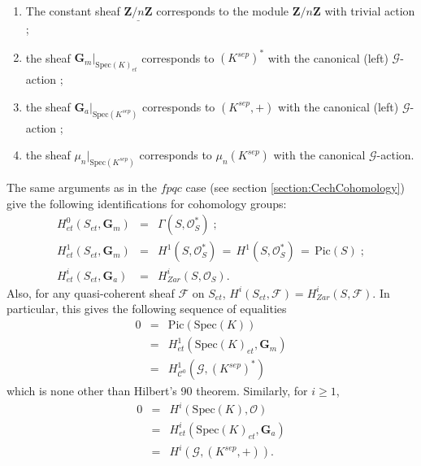 \begin{example} $ $
\begin{enumerate}
\item The constant sheaf $\underline{\mathbf{Z}/n\mathbf{Z}}$ corresponds to the module $\mathbf{Z}/n\mathbf{Z}$ with trivial action ; 
\item the sheaf $\mathbf{G}_m|_{\text{Spec}(K)_{et}}$ corresponds to $(K^{sep})^*$ with the canonical (left) $\mathcal{G}$-action ;
\item the sheaf $\mathbf{G}_a|_{\text{Spec}(K^{sep})}$ corresponds to $(K^{sep}, +)$ with the canonical (left) $\mathcal{G}$-action ;
\item the sheaf $\mu_n|_{\text{Spec}(K^{sep})}$ corresponds to $\mu_n(K^{sep})$ with the canonical $\mathcal{G}$-action.
\end{enumerate}

The same arguments as in the $fpqc$ case (see section \ref{section:CechCohomology}) give the following identifications for cohomology groups:
$$
\begin{array}{ccl}
H_{et}^0(S_{et}, \mathbf{G}_m) & = & \Gamma(S, \mathcal{O}_S^*) \; ; \\
H_{et}^1(S_{et}, \mathbf{G}_m) & = & H^1(S, \mathcal{O}_S^*) \, = \,  H^1(S, \mathcal{O}_S^*) \, = \, \text{Pic}(S) \; ;\\
H_{et}^i(S_{et}, \mathbf{G}_a) & = & H_{Zar}^i(S, \mathcal{O}_S).
\end{array}
$$
Also, for any quasi-coherent sheaf $\mathcal{F}$ on $S_{et}$, $H^i(S_{et}, \mathcal{F}) = H_{Zar}^i(S, \mathcal{F})$.
In particular, this gives the following sequence of equalities
\begin{eqnarray*}
0 & = & \text{Pic}(\text{Spec}(K)) \\
& = & H_{et}^1(\text{Spec}(K)_{et}, \mathbf{G}_m) \\
& = & H^1_{\mathcal{C}^0}(\mathcal{G}, (K^{sep})^*) 
\end{eqnarray*}
which is none other than Hilbert's 90 theorem. Similarly, for $i \geq 1$,
\begin{eqnarray*}
0 & = & H^i(\text{Spec}(K), \mathcal{O}) \\
&  = & H_{et}^i(\text{Spec}(K)_{et}, \mathbf{G}_a) \\
& = & H^i(\mathcal{G}, (K^{sep}, +)).
\end{eqnarray*}
\end{example}


